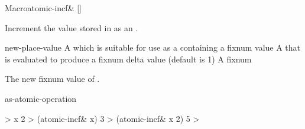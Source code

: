 \begin{functiondoc}{Macro}{atomic-incf\&}{ 
    []
    \returns{} }
%

\fnsyntax \fnpurpose Increment the  value stored in
 as an .

\fnpackage {}

\fnmodule {}

\fnargs
\begin{args}{new-place-value}
\arg[place] A  which is suitable for use as a
 containing a fixnum value
 A  that is evaluated to produce a fixnum delta
value (default is 1)
 A fixnum
\end{args}

\fnreturns The new fixnum value of . 

\begin{alsos}{as-atomic-operation}
\end{alsos}

\fnexamples
%
\W\supp
\begin{example}
  > x
  2
  > (atomic-incf\& x)
  3
  > (atomic-incf\& x 2)
  5
  >
\end{example}

\end{functiondoc}



